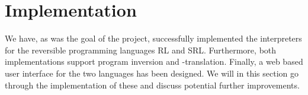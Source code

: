 \chapter{Implementation}

We have, as was the goal of the project, successfully implemented the interpreters for the reversible programming languages RL and SRL. Furthermore, both implementations support program inversion and -translation. Finally, a web based user interface for the two languages has been designed. We will in this section go through the implementation of these and discuss potential further improvements.







